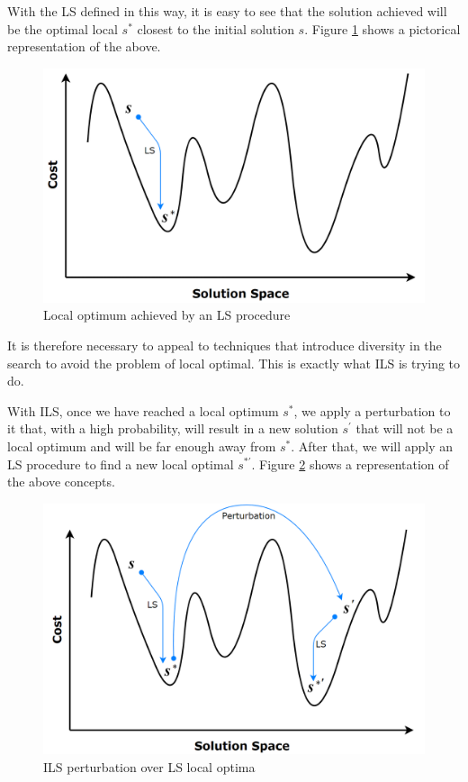 With the \acs{LS} defined in this way, it is easy to see that the solution achieved will be the optimal local $s^*$ closest to the initial solution $s$. Figure \ref{img:LS} shows a pictorical representation of the above.

\begin{figure}[!h]
	\centering
	\includegraphics[scale=0.25]{gfx/NewProp/DILS/LS.png}
	\caption[Local optimum achieved by an LS procedure]{Local optimum achieved by an \acs{LS} procedure}\label{img:LS}
\end{figure}

It is therefore necessary to appeal to techniques that introduce diversity in the search to avoid the problem of local optimal. This is exactly what \acs{ILS} is trying to do.

With \acs{ILS}, once we have reached a local optimum $s^*$, we apply a perturbation to it that, with a high probability, will result in a new solution $s^\prime$ that will not be a local optimum and will be far enough away from $s^*$. After that, we will apply an \acs{LS} procedure to find a new local optimal $s^{*\prime}$. Figure \ref{img:ILS} shows a representation of the above concepts.

\begin{figure}[!h]
	\centering
	\includegraphics[scale=0.25]{gfx/NewProp/DILS/ILS.png}
	\caption[ILS perturbation over LS local optima]{\acs{ILS} perturbation over \acs{LS} local optima}\label{img:ILS}
\end{figure}

